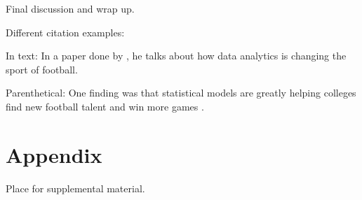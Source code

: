 \documentclass[12pt]{article}
\begin{document}
Final discussion and wrap up.

Different citation examples:

In text:
In a paper done by \citet{kleinfootball}, he talks about how 
data analytics is changing the sport of football.

Parenthetical:
One finding was that statistical models are greatly helping colleges find new football
talent and win more games \citep{kleinfootball}.

\section{Appendix}
\label{sec:app}

Place for supplemental material.



\end{document}
